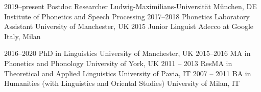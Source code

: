 \documentclass[9pt]{developercv} %
\begin{document}






\begin{entrylist}
	\entry
		{2019--present}
		{Postdoc Researcher}
		{Ludwig-Maximilians-Universität München, DE}
		{Institute of Phonetics and Speech Processing}
	\entry
		{2017--2018}
		{Phonetics Laboratory Assistant}
		{University of Manchester, UK}
		{}
	\entry
		{2015}
		{Junior Linguist}
		{Adecco at Google Italy, Milan}
		{}
\end{entrylist}



\begin{entrylist}
	\entry
		{2016--2020}
		{PhD in Linguistics}
		{University of Manchester, UK}
		{}
	\entry
		{2015--2016}
		{MA in Phonetics and Phonology}
		{University of York, UK}
		{}
	\entry
		{2011 -- 2013}
		{ResMA in Theoretical and Applied Linguistics}
		{University of Pavia, IT}
		{}
	\entry
		{2007 -- 2011}
		{BA in Humanities (with Linguistics and Oriental Studies)}
		{University of Milan, IT}
		{}
\end{entrylist}
\end{document}
